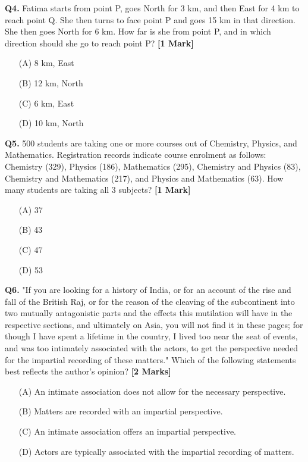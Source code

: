 \documentclass[11pt]{article}
\newcommand{\questiona}[2]{
    \noindent\textbf{Q#2.} #1 \hfill \textbf{[1 Mark]}
}
\newcommand{\questionb}[2]{
    \noindent\textbf{Q#2.} #1 \hfill \textbf{[2 Marks]}
}
\begin{document}
\questiona{Fatima starts from point P, goes North for 3 km, and then East for 4 km to reach point Q. She then turns to face point P and goes 15 km in that direction. She then goes North for 6 km. How far is she from point P, and in which direction should she go to reach point P?}{4}
\begin{enumerate}
    \item[(A)] 8 km, East  
    \item[(B)] 12 km, North  
    \item[(C)] 6 km, East  
    \item[(D)] 10 km, North  
\end{enumerate}
\vspace{0.5cm}

\questiona{500 students are taking one or more courses out of Chemistry, Physics, and Mathematics. Registration records indicate course enrolment as follows: Chemistry (329), Physics (186), Mathematics (295), Chemistry and Physics (83), Chemistry and Mathematics (217), and Physics and Mathematics (63). How many students are taking all 3 subjects?}{5}
\begin{enumerate}
    \item[(A)] 37  
    \item[(B)] 43  
    \item[(C)] 47  
    \item[(D)] 53  
\end{enumerate}
\vspace{0.5cm}

\questionb{"If you are looking for a history of India, or for an account of the rise and fall of the British Raj, or for the reason of the cleaving of the subcontinent into two mutually antagonistic parts and the effects this mutilation will have in the respective sections, and ultimately on Asia, you will not find it in these pages; for though I have spent a lifetime in the country, I lived too near the seat of events, and was too intimately associated with the actors, to get the perspective needed for the impartial recording of these matters." Which of the following statements best reflects the author's opinion?}{6}
\begin{enumerate}
    \item[(A)] An intimate association does not allow for the necessary perspective.  
    \item[(B)] Matters are recorded with an impartial perspective.  
    \item[(C)] An intimate association offers an impartial perspective.  
    \item[(D)] Actors are typically associated with the impartial recording of matters.  
\end{enumerate}
\vspace{0.5cm}
\end{document}
